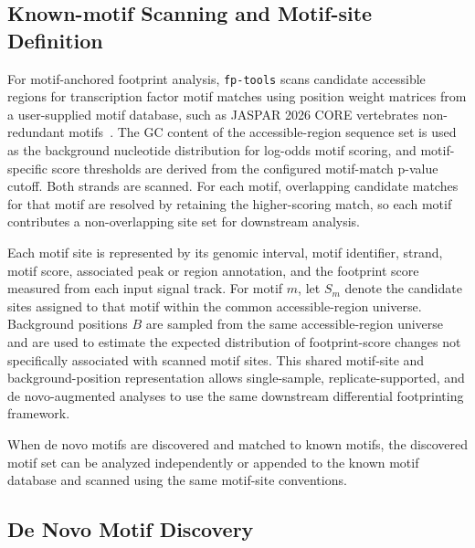 \documentclass[biomedinformatics,article,submit,pdftex,moreauthors]{Definitions/mdpi}
\begin{document}
\subsection{Known-motif Scanning and Motif-site Definition}

For motif-anchored footprint analysis, \texttt{fp-tools} scans candidate
accessible regions for transcription factor motif matches using position weight
matrices from a user-supplied motif database, such as JASPAR 2026 CORE
vertebrates non-redundant motifs~\cite{jaspar2026}. The GC content of the
accessible-region sequence set is used as the background nucleotide distribution
for log-odds motif scoring, and motif-specific score thresholds are derived from
the configured motif-match p-value cutoff. Both strands are scanned. For each
motif, overlapping candidate matches for that motif are resolved by retaining
the higher-scoring match, so each motif contributes a non-overlapping site set
for downstream analysis.

Each motif site is represented by its genomic interval, motif identifier, strand,
motif score, associated peak or region annotation, and the footprint score
measured from each input signal track. For motif $m$, let $S_m$ denote the
candidate sites assigned to that motif within the common accessible-region
universe. Background positions $B$ are sampled from the same accessible-region
universe and are used to estimate the expected distribution of footprint-score
changes not specifically associated with scanned motif sites. This shared
motif-site and background-position representation allows single-sample,
replicate-supported, and de novo-augmented analyses to use the same downstream
differential footprinting framework.

When de novo motifs are discovered and matched to known motifs, the discovered
motif set can be analyzed independently or appended to the known motif database
and scanned using the same motif-site conventions.


\subsection{De Novo Motif Discovery}
\end{document}
